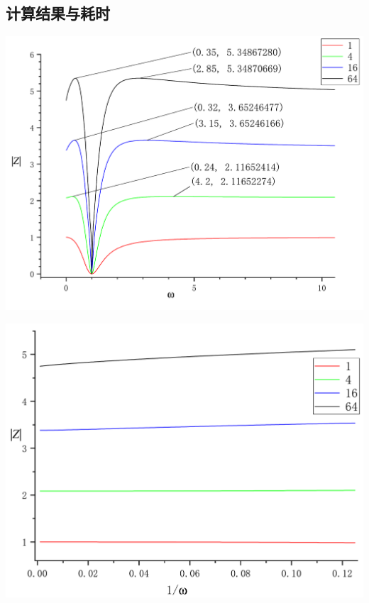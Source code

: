 \documentclass[UTF8]{ctexart}
\begin{document}
        \subsection{计算结果与耗时}
            \begin{center}
                \includegraphics[width=14cm]{Abs_1_10.pdf}
            \end{center}
            \begin{center}
                \includegraphics[width=14cm]{Abs_1000_8.pdf}
            \end{center}
\end{document}
